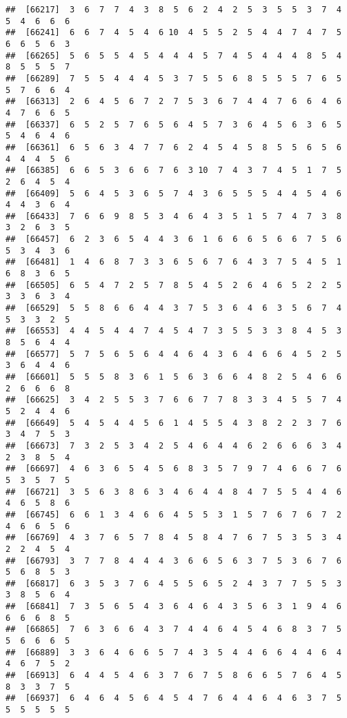 \documentclass[
]{book}
\begin{document}
\begin{verbatim}
##  [66217]  3  6  7  7  4  3  8  5  6  2  4  2  5  3  5  5  3  7  4  5  4  6  6  6
##  [66241]  6  6  7  4  5  4  6 10  4  5  5  2  5  4  4  7  4  7  5  6  6  5  6  3
##  [66265]  5  6  5  5  4  5  4  4  4  5  7  4  5  4  4  4  8  5  4  8  5  5  5  7
##  [66289]  7  5  5  4  4  4  5  3  7  5  5  6  8  5  5  5  7  6  5  5  7  6  6  4
##  [66313]  2  6  4  5  6  7  2  7  5  3  6  7  4  4  7  6  6  4  6  4  7  6  6  5
##  [66337]  6  5  2  5  7  6  5  6  4  5  7  3  6  4  5  6  3  6  5  5  4  6  4  6
##  [66361]  6  5  6  3  4  7  7  6  2  4  5  4  5  8  5  5  6  5  6  4  4  4  5  6
##  [66385]  6  6  5  3  6  6  7  6  3 10  7  4  3  7  4  5  1  7  5  2  6  4  5  4
##  [66409]  5  6  4  5  3  6  5  7  4  3  6  5  5  5  4  4  5  4  6  4  4  3  6  4
##  [66433]  7  6  6  9  8  5  3  4  6  4  3  5  1  5  7  4  7  3  8  3  2  6  3  5
##  [66457]  6  2  3  6  5  4  4  3  6  1  6  6  6  5  6  6  7  5  6  5  3  4  3  6
##  [66481]  1  4  6  8  7  3  3  6  5  6  7  6  4  3  7  5  4  5  1  6  8  3  6  5
##  [66505]  6  5  4  7  2  5  7  8  5  4  5  2  6  4  6  5  2  2  5  3  3  6  3  4
##  [66529]  5  5  8  6  6  4  4  3  7  5  3  6  4  6  3  5  6  7  4  5  3  3  2  5
##  [66553]  4  4  5  4  4  7  4  5  4  7  3  5  5  3  3  8  4  5  3  8  5  6  4  4
##  [66577]  5  7  5  6  5  6  4  4  6  4  3  6  4  6  6  4  5  2  5  3  6  4  4  6
##  [66601]  5  5  5  8  3  6  1  5  6  3  6  6  4  8  2  5  4  6  6  2  6  6  6  8
##  [66625]  3  4  2  5  5  3  7  6  6  7  7  8  3  3  4  5  5  7  4  5  2  4  4  6
##  [66649]  5  4  5  4  4  5  6  1  4  5  5  4  3  8  2  2  3  7  6  3  4  7  5  3
##  [66673]  7  3  2  5  3  4  2  5  4  6  4  4  6  2  6  6  6  3  4  2  3  8  5  4
##  [66697]  4  6  3  6  5  4  5  6  8  3  5  7  9  7  4  6  6  7  6  5  3  5  7  5
##  [66721]  3  5  6  3  8  6  3  4  6  4  4  8  4  7  5  5  4  4  6  4  6  5  8  6
##  [66745]  6  6  1  3  4  6  6  4  5  5  3  1  5  7  6  7  6  7  2  4  6  6  5  6
##  [66769]  4  3  7  6  5  7  8  4  5  8  4  7  6  7  5  3  5  3  4  2  2  4  5  4
##  [66793]  3  7  7  8  4  4  4  3  6  6  5  6  3  7  5  3  6  7  6  5  6  8  5  3
##  [66817]  6  3  5  3  7  6  4  5  5  6  5  2  4  3  7  7  5  5  3  3  8  5  6  4
##  [66841]  7  3  5  6  5  4  3  6  4  6  4  3  5  6  3  1  9  4  6  6  6  6  8  5
##  [66865]  7  6  3  6  6  4  3  7  4  4  6  4  5  4  6  8  3  7  5  5  6  6  6  5
##  [66889]  3  3  6  4  6  6  5  7  4  3  5  4  4  6  6  4  4  6  4  4  6  7  5  2
##  [66913]  6  4  4  5  4  6  3  7  6  7  5  8  6  6  5  7  6  4  5  8  3  3  7  5
##  [66937]  6  4  6  4  5  6  4  5  4  7  6  4  4  6  4  6  3  7  5  5  5  5  5  5

\end{verbatim}
\end{document}
